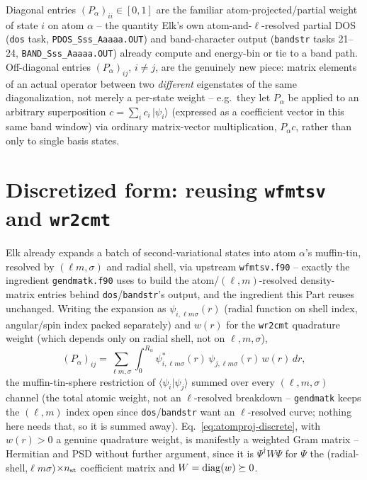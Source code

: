 \documentclass[11pt]{article}
\begin{document}
Diagonal entries $(P_\alpha)_{ii}\in[0,1]$ are the familiar atom-projected/partial weight
of state $i$ on atom $\alpha$ -- the quantity Elk's own atom-and-$\ell$-resolved partial
DOS (\texttt{dos} task, \texttt{PDOS\_Sss\_Aaaaa.OUT}) and band-character output
(\texttt{bandstr} tasks 21--24, \texttt{BAND\_Sss\_Aaaaa.OUT}) already compute and
energy-bin or tie to a band path. Off-diagonal entries $(P_\alpha)_{ij}$, $i\neq j$, are
the genuinely new piece: matrix elements of an actual operator between two \emph{different}
eigenstates of the same diagonalization, not merely a per-state weight -- e.g.\ they let
$P_\alpha$ be applied to an arbitrary superposition $c=\sum_i c_i\,|\psi_i\rangle$
(expressed as a coefficient vector in this same band window) via ordinary matrix-vector
multiplication, $P_\alpha c$, rather than only to single basis states.

\section{Discretized form: reusing \texttt{wfmtsv} and \texttt{wr2cmt}}

Elk already expands a batch of second-variational states into atom $\alpha$'s
muffin-tin, resolved by $(\ell m,\sigma)$ and radial shell, via upstream
\texttt{wfmtsv.f90} -- exactly the ingredient \texttt{gendmatk.f90} uses to build the
atom/$(\ell,m)$-resolved density-matrix entries behind \texttt{dos}/\texttt{bandstr}'s
output, and the ingredient this Part reuses unchanged. Writing the expansion as
$\psi_{i,\ell m\sigma}(r)$ (radial function on shell index, angular/spin index packed
separately) and $w(r)$ for the \texttt{wr2cmt} quadrature weight (which depends only on
radial shell, not on $\ell,m,\sigma$),
\begin{equation}
  (P_\alpha)_{ij} = \sum_{\ell m,\sigma}\int_0^{R_\alpha}
    \psi_{i,\ell m\sigma}^*(r)\,\psi_{j,\ell m\sigma}(r)\,w(r)\,dr,
  \label{eq:atomproj-discrete}
\end{equation}
the muffin-tin-sphere restriction of $\langle\psi_i|\psi_j\rangle$ summed over every
$(\ell,m,\sigma)$ channel (the total atomic weight, not an $\ell$-resolved breakdown --
\texttt{gendmatk} keeps the $(\ell,m)$ index open since \texttt{dos}/\texttt{bandstr}
want an $\ell$-resolved curve; nothing here needs that, so it is summed away).
Eq.~\eqref{eq:atomproj-discrete}, with $w(r)>0$ a genuine quadrature weight, is manifestly
a weighted Gram matrix -- Hermitian and PSD without further argument, since it is
$\Psi^\dagger W \Psi$ for $\Psi$ the (radial-shell,$\ell m\sigma$)$\times n_{\rm st}$
coefficient matrix and $W={\rm diag}(w)\succeq0$.
\end{document}
